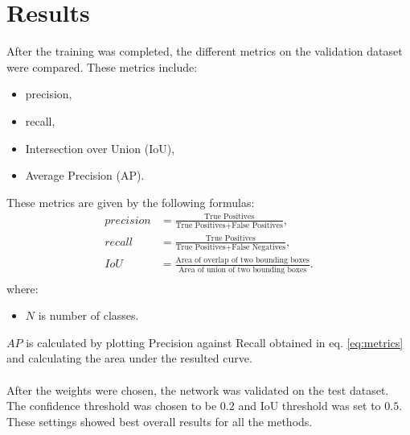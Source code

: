\documentclass[twoside]{ctuthesis}
\theoremstyle{plain}
\theoremstyle{definition}
\theoremstyle{note}
\begin{document}
\chapter{Results}
After the training was completed, the different metrics on the validation dataset were compared. These metrics include:
\begin{itemize}
	\item precision,
	\item recall,
	\item Intersection over Union (IoU),
	\item Average Precision (AP).
\end{itemize}
These metrics are given by the following formulas:
\begin{equation}
	\begin{aligned}
		precision &= \frac{\text{True Positives}}{\text{True Positives} + \text{False Positives}},\\
		recall &= \frac{\text{True Positives}}{\text{True Positives} + \text{False Negatives}},\\
		IoU &= \frac{\text{Area of overlap of two bounding boxes}}{\text{Area of union of two bounding boxes}}.\\
	\end{aligned}
\label{eq:metrics}
\end{equation}
where:
\begin{itemize}
	\item $N$ is number of classes.
\end{itemize}
$AP$ is calculated by plotting Precision against Recall obtained in eq. \eqref{eq:metrics} and calculating the area under the resulted curve.\\
\\
After the weights were chosen, the network was validated on the test dataset. The confidence threshold was chosen to be $0.2$ and IoU threshold was set to $0.5$. These settings showed best overall results for all the methods.
\end{document}
